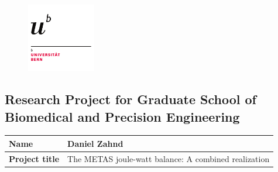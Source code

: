 \documentclass{article}
\begin{document}
	
\begin{figure}[h]
	\raggedleft
	\includegraphics[width=3cm]{figures/uni_bern.png}
\end{figure}

\normalsize

\subsection*{Research Project for Graduate School of Biomedical and Precision Engineering}
\renewcommand{\arraystretch}{1.3}
\begin{table}[h!]
	\centering
	\begin{tabularx}{\textwidth}{|l|X|}
		\hline
		\textbf{Name} & Daniel Zahnd \\
		\hline
		\textbf{Project title} & The METAS joule-watt balance: A combined realization \\
		\hline
	\end{tabularx}
\end{table}
\renewcommand{\arraystretch}{1.0}
\end{document}
